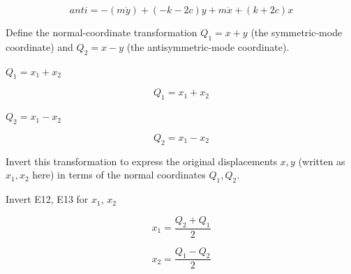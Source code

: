 \documentclass[dvipdfmx]{article}
\begin{document}
\begin{equation}
  anti = -\left(m \ddot{y}\right)+\left(-k-2 c\right) y+m \ddot{x}+\left(k+2 c\right) x
  \label{eq:E11}
\end{equation}

Define the normal-coordinate transformation $Q_1=x+y$ (the symmetric-mode coordinate) and $Q_2=x-y$ (the antisymmetric-mode coordinate).

$Q_1 = x_1 + x_2$

\begin{equation}
  Q_1 = x_1 + x_2
  \label{eq:E12}
\end{equation}

$Q_2 = x_1 - x_2$

\begin{equation}
  Q_2 = x_1 - x_2
  \label{eq:E13}
\end{equation}

Invert this transformation to express the original displacements $x,y$ (written as $x_1,x_2$ here) in terms of the normal coordinates $Q_1,Q_2$.

Invert E12, E13 for $x_1$, $x_2$

\begin{equation}
  x_{1} = \frac{Q_{2}+Q_{1}}{2}
  \label{eq:E14}
\end{equation}

\begin{equation}
  x_{2} = \frac{Q_{1}-Q_{2}}{2}
  \label{eq:E15}
\end{equation}
\end{document}
